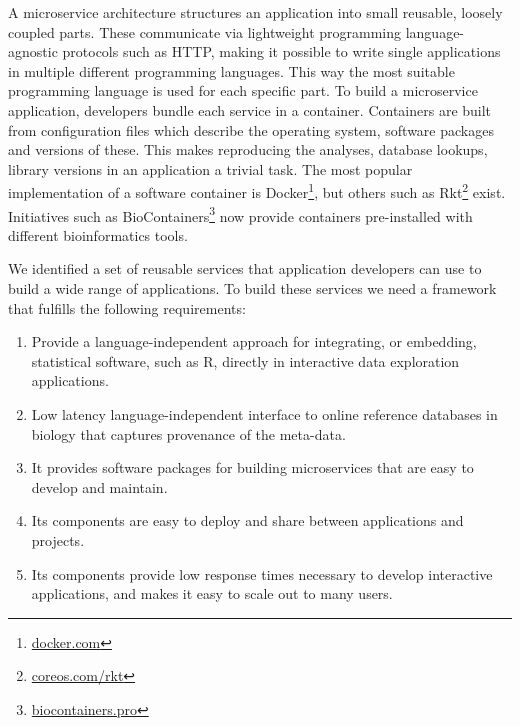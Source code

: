 
A microservice architecture structures an application into small reusable,
loosely coupled parts. These communicate via lightweight programming
language-agnostic protocols such as HTTP, making it possible to write single
applications in multiple different programming languages. This way the
most suitable programming language is used for each specific part. To build a
microservice application, developers bundle each service in a container.
Containers are built from configuration files which describe the operating
system, software packages and versions of these. 
This makes reproducing the analyses, database lookups, library versions in an
application a trivial task. The most popular implementation of a software
container is Docker\footnote{\url{docker.com}}, but others such as
Rkt\footnote{\url{coreos.com/rkt}} exist. Initiatives such as
BioContainers\footnote{\url{biocontainers.pro}} now provide containers
pre-installed with different bioinformatics tools. 

We identified a set of reusable services that application developers can use to
build a wide range of applications.  To build these services we need a framework
that fulfills the following requirements: 

\begin{enumerate}
    \item Provide a language-independent approach for integrating, or
        embedding, statistical software, such as R, directly in 
        interactive data exploration applications.
    \item Low latency language-independent interface to online
        reference databases in biology that captures provenance of the
        meta-data. 
    \item It provides software packages for building microservices that are easy
        to develop and maintain. 
    \item Its components are easy to deploy and share between applications and
        projects. 
    \item Its components provide low response times necessary to develop
        interactive applications, and makes it easy to scale out to many users.
\end{enumerate} 

